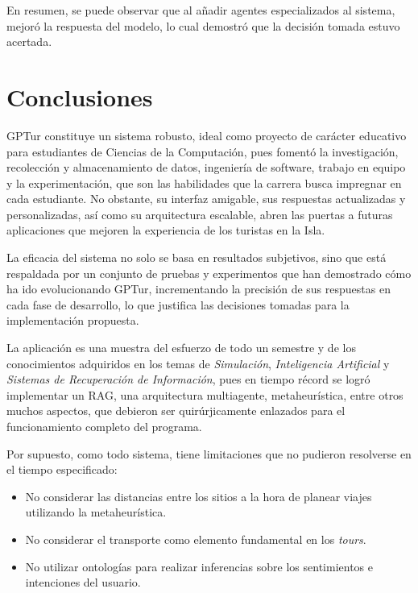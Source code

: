 \documentclass[10pt]{llncs}
\begin{document}
En resumen, se puede observar que al añadir agentes especializados al sistema, mejoró la respuesta del modelo, lo cual demostró 
que la decisión tomada estuvo acertada.

\vspace{\baselineskip}
\section{Conclusiones}


GPTur constituye un sistema robusto, ideal como proyecto de carácter educativo para estudiantes de Ciencias de la Computación, pues fomentó 
la investigación, recolección y almacenamiento de datos, ingeniería de software, trabajo en equipo y la experimentación, que son las habilidades que la carrera busca impregnar en cada 
estudiante. No obstante, su interfaz amigable, sus respuestas actualizadas y personalizadas, así como su arquitectura escalable, abren las puertas a futuras aplicaciones que mejoren la experiencia de los turistas en la Isla.

La eficacia del sistema no solo se basa en resultados subjetivos, sino que está respaldada por un conjunto de pruebas y experimentos que han demostrado cómo ha ido evolucionando GPTur, incrementando la precisión de sus respuestas en cada fase 
de desarrollo, lo que justifica las decisiones tomadas para la implementación propuesta.

La aplicación es una muestra del esfuerzo de todo un semestre y de los conocimientos adquiridos en los temas de \textit{Simulación}, \textit{Inteligencia Artificial} y \textit{Sistemas de Recuperación de Información}, pues en tiempo récord se logró 
implementar un RAG, una arquitectura multiagente, metaheurística, entre otros muchos aspectos, que debieron ser quirúrjicamente enlazados para el funcionamiento completo del programa.

Por supuesto, como todo sistema, tiene limitaciones que no pudieron resolverse en el tiempo especificado:
\begin{itemize}
    \item No considerar las distancias entre los sitios a la hora de planear viajes utilizando la metaheurística.
    \item No considerar el transporte como elemento fundamental en los \textit{tours}.
    \item No utilizar ontologías para realizar inferencias sobre los sentimientos e intenciones del usuario.
\end{itemize}
\end{document}
